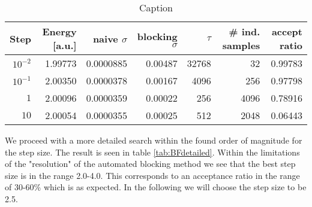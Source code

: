 \documentclass[twoside,english]{uiofysmaster}
\newcommand{\ra}[1]{\renewcommand{\arraystretch}{#1}}
\begin{document}
\begin{table*}\centering
\ra{1.3}
\caption{Caption}
\label{tab:BForders}
\begin{tabular}{rrrrrrr}
\toprule
\toprule
Step & Energy [a.u.]  & naive $\sigma$ & blocking $\sigma$ & $\tau$ &  \# ind. samples & accept ratio \\ 
\midrule 
$10^{-2}$ & 1.99773 & 0.0000885 & 0.00487 & 32768 & 32   & 0.99783  \\
$10^{-1}$ & 2.00350 & 0.0000378 & 0.00167 & 4096  & 256  & 0.97798  \\
$1$       & 2.00096 & 0.0000359 & 0.00022 & 256   & 4096 & 0.78916  \\
$10$      & 2.00054 & 0.0000355 & 0.00025 & 512   & 2048 & 0.06443 \\
\bottomrule
\bottomrule
\end{tabular}
\end{table*}

We proceed with a more detailed search within the found order of magnitude for the step size. The result is seen in table \ref{tab:BFdetailed}. Within the limitations of the "resolution" of the automated blocking method we see that the best step size is in the range 2.0-4.0. This corresponds to an acceptance ratio in the range of 30-60\% which is as expected. In the following we will choose the step size to be 2.5.
\end{document}
